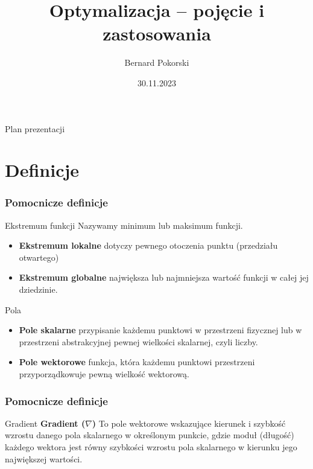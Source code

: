 \documentclass{beamer}
\title{Optymalizacja – pojęcie i zastosowania}
\author{Bernard Pokorski}
\date{30.11.2023}
\begin{document}
\begin{frame}
\titlepage %
\end{frame}

\begin{frame}{Plan prezentacji}
\tableofcontents %
\end{frame}

\section{Definicje}

\begin{frame}
    \frametitle{Pomocnicze definicje}
    \begin{block}{Ekstremum funkcji}
        Nazywamy minimum lub maksimum funkcji.
        \begin{itemize}
            \item \textbf{Ekstremum lokalne} dotyczy pewnego otoczenia punktu
            (przedziału otwartego)
            \item \textbf{Ekstremum globalne} największa lub najmniejsza
            wartość funkcji w całej jej dziedzinie.
        \end{itemize}
    \end{block}
    \begin{block}{Pola}
        \begin{itemize}
            \item \textbf{Pole skalarne} przypisanie każdemu punktowi w przestrzeni fizycznej lub w przestrzeni
            abstrakcyjnej pewnej wielkości skalarnej, czyli liczby.
            \item \textbf{Pole wektorowe} funkcja, która każdemu punktowi przestrzeni przyporządkowuje pewną
            wielkość wektorową.
        \end{itemize}
    \end{block}
\end{frame}

\begin{frame}
    \frametitle{Pomocnicze definicje}
    \begin{block}{Gradient}
    \textbf{Gradient  ($\nabla$)} To pole wektorowe wskazujące kierunek i szybkość wzrostu danego pola skalarnego w
    określonym punkcie, gdzie moduł (długość) każdego wektora jest równy szybkości wzrostu pola
    skalarnego w kierunku jego największej wartości.
    \end{block}
\end{frame}
\end{document}
